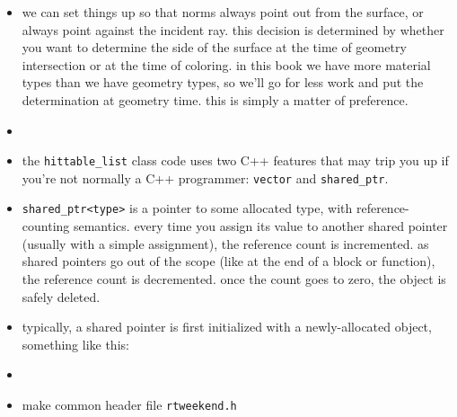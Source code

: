 \begin{itemize}
    \item we can set things up so that norms always point out from the surface,
        or always point against the incident ray. this decision is determined by
        whether you want to determine the side of the surface at the time of
        geometry intersection or at the time of coloring. in this book we have
        more material types than we have geometry types, so we'll go for less
        work and put the determination at geometry time. this is simply a matter
        of preference.
    \item %
    \item the \texttt{hittable_list} class code uses two C++ features that may
        trip you up if you're not normally a C++ programmer: \texttt{vector} and
        \texttt{shared_ptr}.
    \item \texttt{shared_ptr<type>} is a pointer to some allocated type, with
        reference-counting semantics. every time you assign its value to another
        shared pointer (usually with a simple assignment), the reference count
        is incremented. as shared pointers go out of the scope (like at the end
        of a block or function), the reference count is decremented. once the
        count goes to zero, the object is safely deleted.
    \item typically, a shared pointer is first initialized with a
        newly-allocated object, something like this:
    \item %
    \item make common header file \texttt{rtweekend.h}
\end{itemize}
